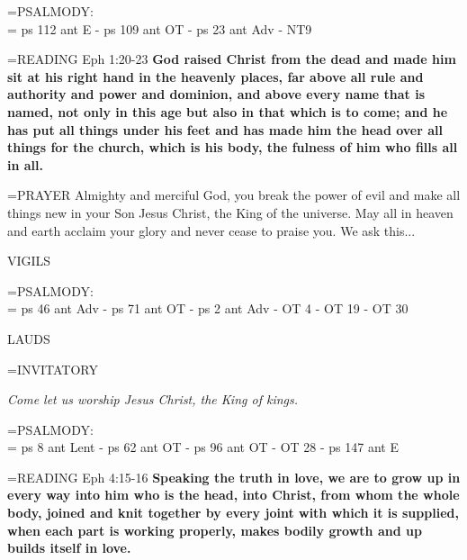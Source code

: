 \hangindent=\parindent \small{PSALMODY:}\\
\hangindent=\parindent \vspace{0.5em}
ps 112 ant E - ps 109 ant OT - ps 23 ant Adv - NT9

\hangindent=\parindent \small{READING} Eph 1:20-23 \textbf{God raised Christ from the dead and made him sit at his right hand in the heavenly places, far above all rule and authority and power and dominion, and above every name that is named, not only in this age but also in that which is to come; and he has put all things under his feet and has made him the head over all things for the church, which is his body, the fulness of him who fills all in all.\\}

\hangindent=\parindent \small{PRAYER  Almighty and merciful God, you break the power of evil and make all things new in your Son Jesus Christ, the King of the universe. May all in heaven and earth acclaim your glory and never cease to praise you. We ask this...}

\begin{flushleft}\normalsize VIGILS\\\end{flushleft}

\hangindent=\parindent \small{PSALMODY:}\\
\hangindent=\parindent \vspace{0.5em}
ps 46 ant Adv - ps 71 ant OT - ps 2 ant Adv - OT 4 - OT 19 - OT 30

\begin{flushleft}\normalsize LAUDS\\\end{flushleft}

\hangindent=\parindent \small{INVITATORY}
\begin{center}
\textit{Come let us worship Jesus Christ, the King of kings.\\}
\end{center}

\hangindent=\parindent \small{PSALMODY:}\\
\hangindent=\parindent \vspace{0.5em}
ps 8 ant Lent - ps 62 ant OT - ps 96 ant OT - OT 28 - ps 147 ant E

\hangindent=\parindent \small{READING} Eph 4:15-16 \textbf{Speaking the truth in love, we are to grow up in every way into him who is the head, into Christ, from whom the whole body, joined and knit together by every joint with which it is supplied, when each part is working properly, makes bodily growth and up builds itself in love.\\}

